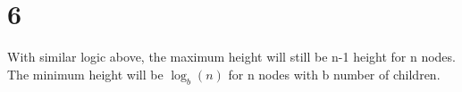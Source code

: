 \documentclass{article}
\begin{document}
\section{6}
With similar logic above, the maximum height will still be n-1 height for n nodes. The minimum height will be $\log_{b} (n)$ for n nodes with b number of children.\linebreak
\linebreak

\end{document}
